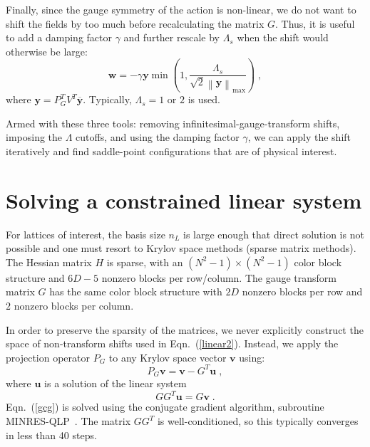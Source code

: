 \documentclass[preprint,aps,prd]{revtex4-2}
\newcommand{\be}{\begin{equation}}
\newcommand{\eq}{\end{equation}}
\begin{document}
Finally, since the gauge symmetry of the action is non-linear,
we do not want to shift the fields by too much before recalculating
the matrix $G$.  
Thus, it is useful to add a damping factor $\gamma$ and
further rescale by $\Lambda_s$ when the shift would
otherwise be large:
\be
  \mathbf{w} = - \gamma \mathbf{y} \min\left(1, \frac{\Lambda_s}{
    \sqrt{2} \left\lVert \mathbf{y}\right\rVert_\mathrm{max}}\right) \; ,
\eq
where $\mathbf{y} = P_G^T V^T \overline{\mathbf{y}}$. 
Typically, $\Lambda_s = 1$ or $2$ is used.

Armed with these three tools:  removing infinitesimal-gauge-transform shifts,
imposing the $\Lambda$ cutoffs, and using the damping factor $\gamma$,
we can apply the shift iteratively and find saddle-point configurations
that are of physical interest.


\section{Solving a constrained linear system}
\label{krylov}

For lattices of interest, the basis size $n_L$ is large enough
that direct solution is not possible and one must resort to Krylov
space methods (sparse matrix methods).
The Hessian matrix $H$ is sparse, with an $(N^2-1)\times(N^2-1)$
color block structure and $6D-5$ nonzero blocks per row/column.
The gauge transform matrix $G$ has the same color block structure
with $2 D$ nonzero blocks per row and $2$ nonzero blocks per column.

In order to preserve the sparsity of the matrices, we never
explicitly construct the space of non-transform shifts used in
Eqn.~(\ref{linear2}).  Instead, we apply the projection
operator $P_G$ to any Krylov space vector $\mathbf{v}$ using:
\be
    P_G \mathbf{v} = \mathbf{v} - G^T \mathbf{u} \; ,
\eq
where $\mathbf{u}$ is a solution of the linear system
\be
  G G^T \mathbf{u} = G \mathbf{v} \; .\label{gcg}
\eq
Eqn.~(\ref{gcg}) is solved using the conjugate gradient
algorithm, subroutine MINRES-QLP~\cite{choi_algorithm_2014}.
The matrix $G G^T$ is well-conditioned, so this typically converges
in less than 40 steps.
\end{document}
